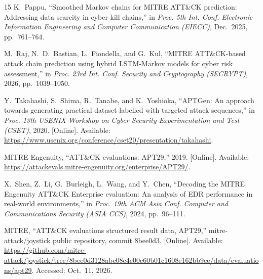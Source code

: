 \documentclass[conference]{IEEEtran}
\begin{document}
\begin{thebibliography}{15}
K.~Pappu, ``Smoothed Markov chains for MITRE ATT\&CK prediction: Addressing data scarcity in cyber kill chains,'' in \emph{Proc. 5th Int. Conf. Electronic Information Engineering and Computer Communication (EIECC)}, Dec.~2025, pp.~761--764.

M.~Raj, N.~D.~Bastian, L.~Fiondella, and G.~Kul, ``MITRE ATT\&CK-based attack chain prediction using hybrid LSTM-Markov models for cyber risk assessment,'' in \emph{Proc. 23rd Int. Conf. Security and Cryptography (SECRYPT)}, 2026, pp.~1039--1050.

Y.~Takahashi, S.~Shima, R.~Tanabe, and K.~Yoshioka, ``APTGen: An approach towards generating practical dataset labelled with targeted attack sequences,'' in \emph{Proc. 13th USENIX Workshop on Cyber Security Experimentation and Test (CSET)}, 2020. [Online]. Available: \url{https://www.usenix.org/conference/cset20/presentation/takahashi}.

MITRE Engenuity, ``ATT\&CK evaluations: APT29,'' 2019. [Online]. Available: \url{https://attackevals.mitre-engenuity.org/enterprise/APT29/}.

X.~Shen, Z.~Li, G.~Burleigh, L.~Wang, and Y.~Chen, ``Decoding the MITRE Engenuity ATT\&CK Enterprise evaluation: An analysis of EDR performance in real-world environments,'' in \emph{Proc. 19th ACM Asia Conf. Computer and Communications Security (ASIA CCS)}, 2024, pp.~96--111.

MITRE, ``ATT\&CK evaluations structured result data, APT29,'' mitre-attack/joystick public repository, commit 8bee0d3. [Online]. Available: \url{https://github.com/mitre-attack/joystick/tree/8bee0d3128abc08c4e00c60b01c1608e162bb9ce/data/evaluations/apt29}. Accessed: Oct.~11, 2026.

\end{thebibliography}
\end{document}
